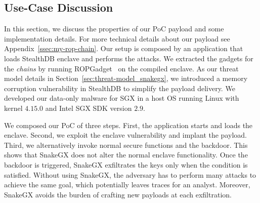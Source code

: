 \subsection{Use-Case Discussion}
\label{ssec:homemade-poc}

In this section, we discuss the properties of 
our PoC payload and some implementation details. For more technical 
details about our payload see Appendix~\ref{ssec:my-rop-chain}.
Our setup is composed by an application that loads StealthDB enclave 
and performs the attacks.
We extracted the gadgets for the \emph{chains} by running
ROPGadget~\cite{ropgadget} on the compiled enclave.
As our threat model details in 
Section~\ref{sec:threat-model_snakegx}, we introduced a memory corruption 
vulnerability 
in StealthDB to simplify the payload delivery.
We developed our data-only malware for SGX in a host OS running Linux with 
kernel $4.15.0$ and Intel SGX SDK version $2.9$.

We composed our PoC of three steps.
First, the application starts and loads the enclave.
Second, we exploit the enclave vulnerability and implant 
the payload.
Third, we alternatively invoke normal secure functions and
the backdoor. This shows that SnakeGX does not alter the normal enclave 
functionality.
Once the backdoor is triggered, SnakeGX exfiltrates the keys only when the 
condition is satisfied.
Without using SnakeGX, the adversary has to perform many 
attacks to achieve the same goal, which potentially leaves traces for an 
analyst.
Moreover, SnakeGX avoids the burden of crafting new payloads at each 
exfiltration.

